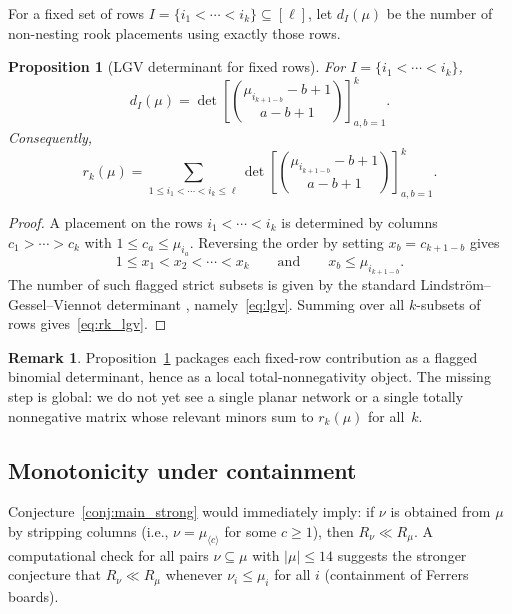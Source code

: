 \documentclass[11pt,reqno]{amsart}
\newtheorem{proposition}[theorem]{Proposition}
\theoremstyle{definition}
\newtheorem{remark}[theorem]{Remark}
\newcommand{\interl}{\ll}
\begin{document}
For a fixed set of rows
$I = \{i_1 < \dotsb < i_k\} \subseteq [\ell]$,
let $d_I(\mu)$ be the number of non-nesting rook placements using exactly
those rows.

\begin{proposition}[LGV determinant for fixed rows]\label{prop:lgv}
For $I = \{i_1 < \dotsb < i_k\}$,
\begin{equation}\label{eq:lgv}
  d_I(\mu)
  =
  \det \!\left[
    \binom{\mu_{i_{k+1-b}} - b + 1}{a - b + 1}
  \right]_{a,b=1}^k.
\end{equation}
Consequently,
\begin{equation}\label{eq:rk_lgv}
  r_k(\mu)
  =
  \sum_{1 \leq i_1 < \dotsb < i_k \leq \ell}
  \det \!\left[
    \binom{\mu_{i_{k+1-b}} - b + 1}{a - b + 1}
  \right]_{a,b=1}^k.
\end{equation}
\end{proposition}
\begin{proof}
A placement on the rows $i_1 < \dotsb < i_k$ is determined by columns
$c_1 > \dotsb > c_k$ with $1 \leq c_a \leq \mu_{i_a}$.
Reversing the order by setting $x_b = c_{k+1-b}$ gives
\[
  1 \leq x_1 < x_2 < \dotsb < x_k
  \qquad\text{and}\qquad
  x_b \leq \mu_{i_{k+1-b}}.
\]
The number of such flagged strict subsets is given by the standard
Lindstr\"om--Gessel--Viennot determinant
\cite{Lindstrom1973,GesselViennot1985}, namely~\eqref{eq:lgv}.
Summing over all $k$-subsets of rows gives~\eqref{eq:rk_lgv}.
\end{proof}

\begin{remark}\label{rem:lgv}
Proposition~\ref{prop:lgv} packages each fixed-row contribution as a
flagged binomial determinant, hence as a local total-nonnegativity object.
The missing step is global: we do not yet see a single planar network
or a single totally nonnegative matrix whose relevant minors sum to
$r_k(\mu)$ for all~$k$.
\end{remark}

\subsection{Monotonicity under containment}

Conjecture~\ref{conj:main_strong} would immediately imply:
if $\nu$ is obtained from $\mu$ by stripping columns
(i.e., $\nu = \mu_{\langle c \rangle}$ for some $c \geq 1$),
then $R_\nu \interl R_\mu$.
A computational check for all pairs $\nu \subseteq \mu$
with $|\mu| \leq 14$ suggests the stronger conjecture that
$R_\nu \interl R_\mu$ whenever $\nu_i \leq \mu_i$ for all $i$
(containment of Ferrers boards).
\end{document}
